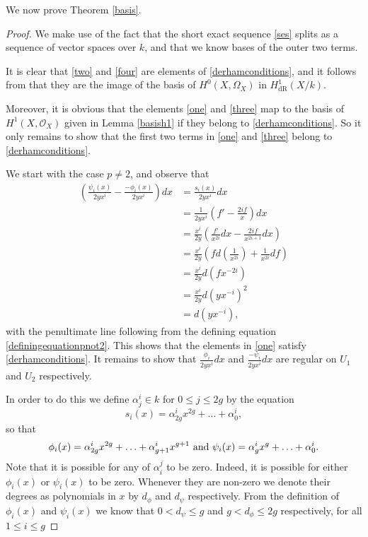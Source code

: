 \documentclass[draft, 11pt]{article} %
\theoremstyle{plain}
\theoremstyle{remark}
\newcommand{\hone}{H^1(X,\mathcal{O}_X)}
\newcommand{\derhamhone}{H_{\text {dR}}^1(X/k)}
\begin{document}
We now prove Theorem \ref{basis}.

\begin{proof}
We make use of the fact that the short exact sequence \eqref{ses} splits as a sequence of vector spaces over $k$, and that we know bases of the outer two terms.

It is clear that \eqref{two} and \eqref{four} are elements of \eqref{derhamconditions}, and it follows from \cite[Thm 6.1]{faithfulaction} that they are the image of the basis of $H^0(X,\Omega_X)$ in $\derhamhone$.

Moreover, it is obvious that the elements \eqref{one} and \eqref{three} map to the basis of $\hone$ given in Lemma \ref{basish1} if they belong to \eqref{derhamconditions}.
So it only remains to show that the first two terms in \eqref{one} and \eqref{three} belong to \eqref{derhamconditions}.


We start with the case $p\neq 2$, and observe that
\begin{align*}
\left(  \frac{\psi_i(x)}{2yx^i}  - \frac{-\phi_i(x)}{2yx^i} \right) dx & =  \frac{s_i(x)}{2yx^i} dx \\
& =  \frac{1}{2yx^i} \left( f' - \frac{2if}{x} \right) dx \\
& =  \frac{x^i}{2y} \left( \frac{f'}{x^{2i}}dx -\frac{2if}{x^{2i+1}} dx \right) \\
& =  \frac{x^i}{2y} \left( fd\left(\frac{1}{x^{2i}}\right) + \frac{1}{x^{2i}}df \right) \\
& =  \frac{x^i}{2y}d(fx^{-2i}) \\
& =  \frac{x^i}{2y} d\left(yx^{-i}\right)^2 \\
& =  d(yx^{-i}),
\end{align*}
with the penultimate line following from the defining equation \eqref{definingequationpnot2}.
This shows that the elements in \eqref{one} satisfy \eqref{derhamconditions}.
It remains to show that $\frac{\phi_i}{2yx^i}dx$ and $\frac{-\psi_i}{2yx^i}dx$ are regular on $U_1$ and $U_2$ respectively.



In order to do this we define $\alpha^i_j \in k$ for $0\leq j \leq 2g$ by the equation
\[
s_i(x) = \alpha^i_{2g}x^{2g} + \ldots + \alpha^i_0,
\]
so that
\[
\phi_i(x) = \alpha^i_{2g}x^{2g} + \ldots + \alpha^i_{g+1}x^{g+1} \ {\rm and } \ \psi_i(x) = \alpha^i_gx^g + \ldots + \alpha^i_0.
\]
Note that it is possible for any of $\alpha_i^j$ to be zero. Indeed, it is possible for either $\phi_i(x)$ or $\psi_i(x)$ to be zero.
Whenever they are non-zero we denote their degrees as polynomials in $x$ by $d_\phi$ and $d_\psi$ respectively. From the definition of $\phi_i(x)$ and $\psi_i(x)$ we know that $0 < d_\psi \leq g$ and $g < d_\phi \leq 2g$ respectively, for all $1 \leq i \leq g$



\end{proof}
\end{document}

